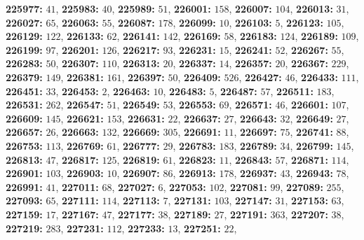 \textsf{\bfseries 225977:} $41$, \textsf{\bfseries 225983:} $40$, \textsf{\bfseries 225989:} $51$, \textsf{\bfseries 226001:} $158$, \textsf{\bfseries 226007:} $104$, \textsf{\bfseries 226013:} $31$, \textsf{\bfseries 226027:} $65$, \textsf{\bfseries 226063:} $55$, \textsf{\bfseries 226087:} $178$, \textsf{\bfseries 226099:} $10$, \textsf{\bfseries 226103:} $5$, \textsf{\bfseries 226123:} $105$, \textsf{\bfseries 226129:} $122$, \textsf{\bfseries 226133:} $62$, \textsf{\bfseries 226141:} $142$, \textsf{\bfseries 226169:} $58$, \textsf{\bfseries 226183:} $124$, \textsf{\bfseries 226189:} $109$, \textsf{\bfseries 226199:} $97$, \textsf{\bfseries 226201:} $126$, \textsf{\bfseries 226217:} $93$, \textsf{\bfseries 226231:} $15$, \textsf{\bfseries 226241:} $52$, \textsf{\bfseries 226267:} $55$, \textsf{\bfseries 226283:} $50$, \textsf{\bfseries 226307:} $110$, \textsf{\bfseries 226313:} $20$, \textsf{\bfseries 226337:} $14$, \textsf{\bfseries 226357:} $20$, \textsf{\bfseries 226367:} $229$, \textsf{\bfseries 226379:} $149$, \textsf{\bfseries 226381:} $161$, \textsf{\bfseries 226397:} $50$, \textsf{\bfseries 226409:} $526$, \textsf{\bfseries 226427:} $46$, \textsf{\bfseries 226433:} $111$, \textsf{\bfseries 226451:} $33$, \textsf{\bfseries 226453:} $2$, \textsf{\bfseries 226463:} $10$, \textsf{\bfseries 226483:} $5$, \textsf{\bfseries 226487:} $57$, \textsf{\bfseries 226511:} $183$, \textsf{\bfseries 226531:} $262$, \textsf{\bfseries 226547:} $51$, \textsf{\bfseries 226549:} $53$, \textsf{\bfseries 226553:} $69$, \textsf{\bfseries 226571:} $46$, \textsf{\bfseries 226601:} $107$, \textsf{\bfseries 226609:} $145$, \textsf{\bfseries 226621:} $153$, \textsf{\bfseries 226631:} $22$, \textsf{\bfseries 226637:} $27$, \textsf{\bfseries 226643:} $32$, \textsf{\bfseries 226649:} $27$, \textsf{\bfseries 226657:} $26$, \textsf{\bfseries 226663:} $132$, \textsf{\bfseries 226669:} $305$, \textsf{\bfseries 226691:} $11$, \textsf{\bfseries 226697:} $75$, \textsf{\bfseries 226741:} $88$, \textsf{\bfseries 226753:} $113$, \textsf{\bfseries 226769:} $61$, \textsf{\bfseries 226777:} $29$, \textsf{\bfseries 226783:} $183$, \textsf{\bfseries 226789:} $34$, \textsf{\bfseries 226799:} $145$, \textsf{\bfseries 226813:} $47$, \textsf{\bfseries 226817:} $125$, \textsf{\bfseries 226819:} $61$, \textsf{\bfseries 226823:} $11$, \textsf{\bfseries 226843:} $57$, \textsf{\bfseries 226871:} $114$, \textsf{\bfseries 226901:} $103$, \textsf{\bfseries 226903:} $10$, \textsf{\bfseries 226907:} $86$, \textsf{\bfseries 226913:} $178$, \textsf{\bfseries 226937:} $43$, \textsf{\bfseries 226943:} $78$, \textsf{\bfseries 226991:} $41$, \textsf{\bfseries 227011:} $68$, \textsf{\bfseries 227027:} $6$, \textsf{\bfseries 227053:} $102$, \textsf{\bfseries 227081:} $99$, \textsf{\bfseries 227089:} $255$, \textsf{\bfseries 227093:} $65$, \textsf{\bfseries 227111:} $114$, \textsf{\bfseries 227113:} $7$, \textsf{\bfseries 227131:} $103$, \textsf{\bfseries 227147:} $31$, \textsf{\bfseries 227153:} $63$, \textsf{\bfseries 227159:} $17$, \textsf{\bfseries 227167:} $47$, \textsf{\bfseries 227177:} $38$, \textsf{\bfseries 227189:} $27$, \textsf{\bfseries 227191:} $363$, \textsf{\bfseries 227207:} $38$, \textsf{\bfseries 227219:} $283$, \textsf{\bfseries 227231:} $112$, \textsf{\bfseries 227233:} $13$, \textsf{\bfseries 227251:} $22$, 
